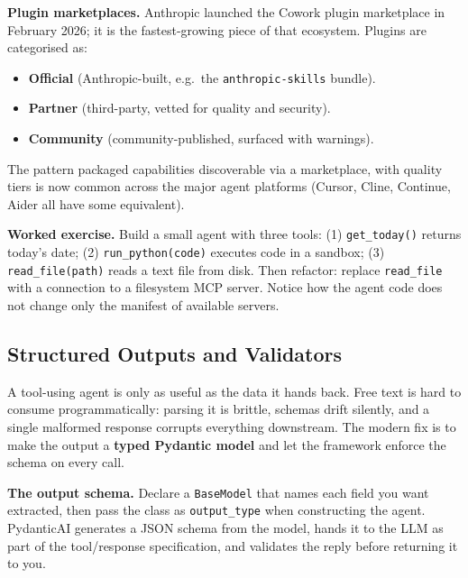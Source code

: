 \documentclass[a4paper,11pt]{article}
\begin{document}
\textbf{Plugin marketplaces.} Anthropic launched the Cowork plugin
marketplace in February 2026; it is the fastest-growing piece of
that ecosystem. Plugins are categorised as:

\begin{itemize}[noitemsep, leftmargin=1.2em]
  \item \textbf{Official} (Anthropic-built, e.g.\ the
        \texttt{anthropic-skills} bundle).
  \item \textbf{Partner} (third-party, vetted for quality and
        security).
  \item \textbf{Community} (community-published, surfaced with
        warnings).
\end{itemize}

The pattern \textemdash{} packaged capabilities discoverable via a
marketplace, with quality tiers \textemdash{} is now common across
the major agent platforms (Cursor, Cline, Continue, Aider all have
some equivalent).

\begin{callout}
\textbf{Worked exercise.}
Build a small agent with three tools:
(1) \texttt{get\_today()} \textemdash{} returns today's date;
(2) \texttt{run\_python(code)} \textemdash{} executes code in a
sandbox;
(3) \texttt{read\_file(path)} \textemdash{} reads a text file from
disk. Then refactor: replace \texttt{read\_file} with a connection
to a filesystem MCP server. Notice how the agent code does not
change \textemdash{} only the manifest of available servers.
\end{callout}

\subsection{Structured Outputs and Validators}

A tool-using agent is only as useful as the data it hands back. Free
text is hard to consume programmatically: parsing it is brittle,
schemas drift silently, and a single malformed response corrupts
everything downstream. The modern fix is to make the output a
\textbf{typed Pydantic model} and let the framework enforce the
schema on every call.

\textbf{The output schema.} Declare a \texttt{BaseModel} that names
each field you want extracted, then pass the class as
\texttt{output\_type} when constructing the agent. PydanticAI
generates a JSON schema from the model, hands it to the LLM as part
of the tool/response specification, and validates the reply before
returning it to you.
\end{document}
